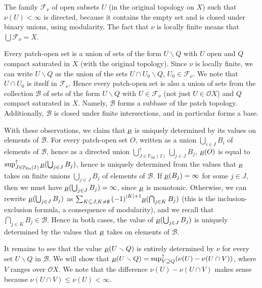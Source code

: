 \documentclass[preprint,12pt]{elsarticle}
\newcommand\pow{\mathbb{P}}
\newcommand\Pfin{\pow_{\mathrm{fin}}}
\newcommand\diff{\smallsetminus}
\newcommand\Open{{\mathcal O}}
\newcommand\dsup{\sup\nolimits^{\scriptstyle\uparrow}}
\newcommand\dcup{\bigcup\nolimits^{\scriptstyle\uparrow}}
\begin{document}
The family $\mathcal F_\nu$ of open subsets $U$ (in the original
topology on $X$) such that $\nu (U) < \infty$ is directed, because it
contains the empty set and is closed under binary unions, using
modularity.  The fact that $\nu$ is locally finite means that
$\bigcup \mathcal F_\nu = X$.

Every patch-open set is a union of sets of the form $U \diff Q$ with
$U$ open and $Q$ compact saturated in $X$ (with the original
topology).  Since $\nu$ is locally finite, we can write $U \diff Q$ as
the union of the sets $U \cap U_0 \diff Q$, $U_0 \in \mathcal F_\nu$.
We note that $U \cap U_0$ is itself in $\mathcal F_\nu$.  Hence every
patch-open set is also a union of sets from the collection
$\mathcal B$ of sets of the form $U \diff Q$ with
$U \in \mathcal F_\nu$ (not just $U \in \Open X$) and $Q$ compact
saturated in $X$.  Namely, $\mathcal B$ forms a subbase of the patch
topology.  Additionally, $\mathcal B$ is closed under finite
intersections, and in particular forms a base.

With these observations, we claim that $\underline{\smash\mu}$ is
uniquely determined by its values on elements of $\mathcal B$.  For
every patch-open set $O$, written as a union $\bigcup_{i \in I} B_i$
of elements of $\mathcal B$, hence as a directed union
$\dcup_{J \in \Pfin (I)} \bigcup_{j \in J} B_j$,
$\underline{\smash\mu} (O)$ is equal to
$\dsup_{J \in \Pfin (I)} \underline{\smash\mu} (\bigcup_{j \in J}
B_j)$, hence is uniquely determined from the values that
$\underline{\smash\mu}$ takes on finite unions $\bigcup_{j \in J} B_j$
of elements of $\mathcal B$.  If
$\underline{\smash\mu} (B_j) = \infty$ for some $j \in J$, then we
must have $\underline{\smash\mu} (\bigcup_{j \in J} B_j) = \infty$,
since $\underline{\smash\mu}$ is monotonic.  Otherwise, we can rewrite
$\underline{\smash\mu} (\bigcup_{j \in J} B_j)$ as
$\sum_{K \subseteq J, K \neq \emptyset} {(-1)}^{|K|+1}
\underline{\smash\mu} (\bigcap_{j \in K} B_j)$ (this is the
inclusion-exclusion formula, a consequence of modularity), and we
recall that $\bigcap_{j \in K} B_j \in \mathcal B$.  Hence in both
cases, the value of $\underline{\smash\mu} (\bigcup_{j \in J} B_j)$ is
uniquely determined by the values that $\underline{\smash\mu}$ takes
on elements of $\mathcal B$.

It remains to see that the value $\underline{\smash\mu} (U \diff Q)$ is entirely
determined by $\nu$ for every set $U \diff Q$ in $\mathcal B$.  We
will show that
$\underline{\smash\mu} (U \diff Q) = \dsup_{V \supseteq Q} (\nu (U) - \nu (U \cap
V))$, where $V$ ranges over $\Open X$.  We note that the difference
$\nu (U) - \nu (U \cap V)$ makes sense because
$\nu (U \cap V) \leq \nu (U) < \infty$.
\end{document}

